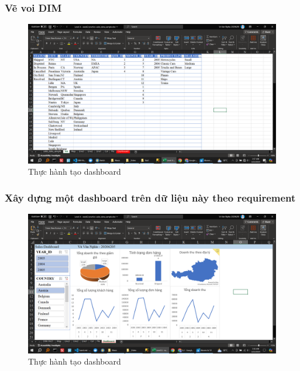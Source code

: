 \documentclass{article}
\begin{document}
    \subsubsection{ Vẽ voi DIM}
        
       
    \begin{figure}[H]
        \centering
        \includegraphics[scale = 0.15]{Bai2/ThucHanh/voi.png}
        \caption{Thực hành tạo dashboard}
        \end{figure}



 \subsubsection{Xây dựng một dashboard trên dữ liệu này theo requirement}

\begin{figure}[H]
\centering
\includegraphics[scale = 0.15]{Bai2/ThucHanh/dashboard.png}
\caption{Thực hành tạo dashboard}
\end{figure}
 
\end{document}
